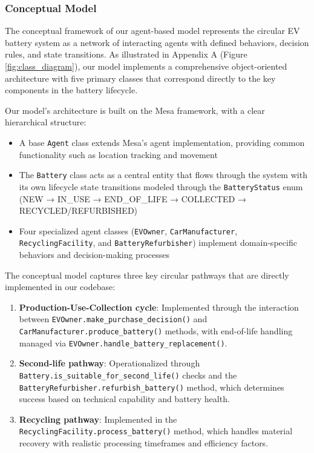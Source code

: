 \subsubsection{Conceptual Model}
The conceptual framework of our agent-based model represents the circular EV battery system as a network of interacting agents with defined behaviors, decision rules, and state transitions. As illustrated in Appendix A (Figure \ref{fig:class_diagram}), our model implements a comprehensive object-oriented architecture with five primary classes that correspond directly to the key components in the battery lifecycle.

Our model's architecture is built on the Mesa framework, with a clear hierarchical structure:
\begin{itemize}
    \item A base \texttt{Agent} class extends Mesa's agent implementation, providing common functionality such as location tracking and movement
    \item The \texttt{Battery} class acts as a central entity that flows through the system with its own lifecycle state transitions modeled through the \texttt{BatteryStatus} enum (NEW → IN\_USE → END\_OF\_LIFE → COLLECTED → RECYCLED/REFURBISHED)
    \item Four specialized agent classes (\texttt{EVOwner}, \texttt{CarManufacturer}, \texttt{RecyclingFacility}, and \texttt{BatteryRefurbisher}) implement domain-specific behaviors and decision-making processes
\end{itemize}

The conceptual model captures three key circular pathways that are directly implemented in our codebase:
\begin{enumerate}
  \item \textbf{Production-Use-Collection cycle}: Implemented through the interaction between \texttt{EVOwner.make\_purchase\_decision()} and \texttt{CarManufacturer.produce\_battery()} methods, with end-of-life handling managed via \texttt{EVOwner.handle\_battery\_replacement()}.
  
  \item \textbf{Second-life pathway}: Operationalized through \texttt{Battery.is\_suitable\_for\_second\_life()} checks and the \texttt{BatteryRefurbisher.refurbish\_battery()} method, which determines success based on technical capability and battery health.
  
  \item \textbf{Recycling pathway}: Implemented in the \texttt{RecyclingFacility.process\_battery()} method, which handles material recovery with realistic processing timeframes and efficiency factors.
\end{enumerate}

